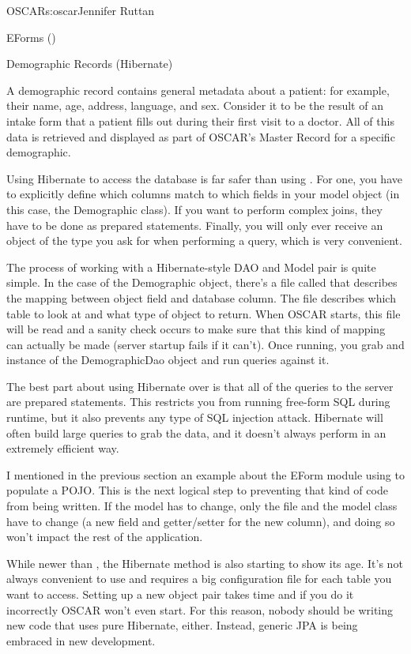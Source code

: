 \begin{aosachapter}{OSCAR}{s:oscar}{Jennifer Ruttan}
\begin{aosasect1}{EForms ()}
\end{aosasect1}

\begin{aosasect1}{Demographic Records (Hibernate)}

A demographic record contains general metadata about a patient: for
example, their name, age, address, language, and sex. Consider it to
be the result of an intake form that a patient fills out during their
first visit to a doctor. All of this data is retrieved and displayed
as part of OSCAR's Master Record for a specific demographic.

Using Hibernate to access the database is far safer than
using . For one, you have to explicitly define which
columns match to which fields in your model object (in this case, the
Demographic class). If you want to perform complex joins, they have to
be done as prepared statements. Finally, you will only ever receive an
object of the type you ask for when performing a query, which is very
convenient.

The process of working with a Hibernate-style DAO and Model pair is
quite simple. In the case of the Demographic object, there's a file
called  that describes the mapping between object
field and database column. The file describes which table to look at
and what type of object to return. When OSCAR starts, this file will
be read and a sanity check occurs to make sure that this kind of
mapping can actually be made (server startup fails if it can't). Once
running, you grab and instance of the DemographicDao object and run
queries against it.

The best part about using Hibernate over  is that all
of the queries to the server are prepared statements. This restricts
you from running free-form SQL during runtime, but it also prevents
any type of SQL injection attack. Hibernate will often build large
queries to grab the data, and it doesn't always perform in an
extremely efficient way.

I mentioned in the previous section an example about the EForm module
using  to populate a POJO. This is the next logical
step to preventing that kind of code from being written. If the model
has to change, only the  file and the model class have
to change (a new field and getter/setter for the new column), and
doing so won't impact the rest of the application.

While newer than , the Hibernate method is also
starting to show its age. It's not always convenient to use and
requires a big configuration file for each table you want to
access. Setting up a new object pair takes time and if you do it
incorrectly OSCAR won't even start. For this reason, nobody should be
writing new code that uses pure Hibernate, either. Instead, generic
JPA is being embraced in new development.


\end{aosasect1}
\end{aosachapter}
